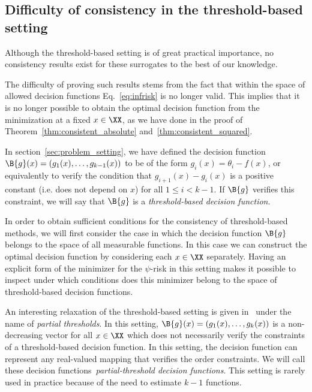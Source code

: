 \subsection{Difficulty of consistency in the threshold-based setting}


Although the threshold-based setting is of great practical importance, no consistency results exist for these surrogates to the best of our knowledge.


The difficulty of proving such results stems from the fact that within the space of allowed decision functions Eq.~\eqref{eq:infrisk} is no longer valid. This implies that it is no longer possible to obtain the optimal decision function from the minimization at a fixed $x \in \XX$, as we have done in the proof of Theorem~\ref{thm:consistent_absolute} and~\ref{thm:consistent_squared}.


In section~\ref{sec:problem_setting}, we have defined the decision function $\B{g}(x) = (g_1(x), \ldots, g_{k-1}(x))$ to be of the form $g_i(x) = \theta_i - f(x)$, or equivalently to verify the condition that $g_{i+1}(x) - g_{i}(x)$ is a positive constant (i.e. does not depend on $x$) for all $1 \leq i < k-1$. 
If $\B{g}$ verifies this constraint, we will say that $\B{g}$ is a \emph{threshold-based decision function}.

In order to obtain sufficient conditions for the consistency of threshold-based methods, we will first consider the case in which the decision function $\B{g}$ belongs to the space of all measurable functions. In this case we can construct the optimal decision function by considering each $x \in \XX$ separately. Having an explicit form of the minimizer for the $\psi$-risk in this setting makes it possible to inspect under which conditions does this minimizer belong to the space of threshold-based decision functions. 

An interesting relaxation of the threshold-based setting is given in~\citep{citeulike:578341} under the name of \emph{partial thresholds}. In this setting,  $\B{g}(x) = (g_1(x), \ldots, g_k(x))$ is a non-decreasing vector for all $x \in \XX$ which does not necessarily verify the constraints of a threshold-based decision function. In this setting, the decision function can represent any real-valued mapping that verifies the order constraints. We will call these decision functions~\emph{partial-threshold decision functions}. This setting is rarely used in practice because of the need to estimate $k-1$ functions.




